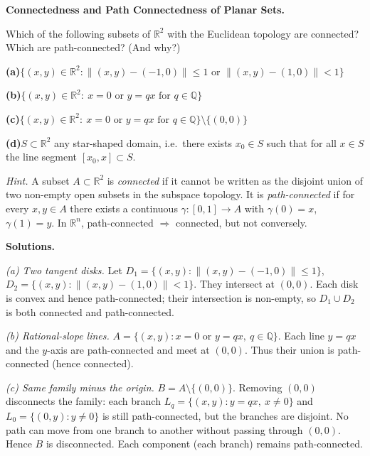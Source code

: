 \begin{problem}[CP-II-0514]
\label{prob:cp-ii-0514}
\textbf{Connectedness and Path Connectedness of Planar Sets.}

\hspace*{1.5em}Which of the following subsets of $\mathbb{R}^2$ with the Euclidean topology are connected?
	Which are path-connected? (And why?)

		\par\smallskip\noindent\textbf{(a)}\quad $\{(x,y)\in\mathbb{R}^2:\|(x,y)-(-1,0)\|\le1
		\text{ or }\|(x,y)-(1,0)\|<1\}$

		\par\smallskip\noindent\textbf{(b)}\quad $\{(x,y)\in\mathbb{R}^2:\ x=0
		\text{ or }y=qx\text{ for }q\in\mathbb{Q}\}$

		\par\smallskip\noindent\textbf{(c)}\quad $\{(x,y)\in\mathbb{R}^2:\ x=0
		\text{ or }y=qx\text{ for }q\in\mathbb{Q}\}\setminus\{(0,0)\}$

		\par\smallskip\noindent\textbf{(d)}\quad $S\subset\mathbb{R}^2$ any star-shaped domain,
		i.e.\ there exists $x_0\in S$ such that for all $x\in S$
		the line segment $[x_0,x]\subset S$.


	\emph{Hint.} A subset $A\subset\mathbb{R}^2$ is \emph{connected} if it cannot be written
	as the disjoint union of two non-empty open subsets in the subspace topology.
	It is \emph{path-connected} if for every $x,y\in A$ there exists a continuous
	$\gamma:[0,1]\to A$ with $\gamma(0)=x$, $\gamma(1)=y$.
	In $\mathbb{R}^n$, path-connected $\Rightarrow$ connected, but not conversely.


	\textbf{Solutions.}

	\textit{(a) Two tangent disks.}
	Let $D_1=\{(x,y):\|(x,y)-(-1,0)\|\le1\}$,
	$D_2=\{(x,y):\|(x,y)-(1,0)\|<1\}$.
	They intersect at $(0,0)$.
	Each disk is convex and hence path-connected;
	their intersection is non-empty,
	so $D_1\cup D_2$ is both connected and path-connected.

	\medskip

	\textit{(b) Rational-slope lines.}
	$A=\{(x,y):x=0\text{ or }y=qx,\ q\in\mathbb{Q}\}$.
	Each line $y=qx$ and the $y$-axis are path-connected and meet at $(0,0)$.
	Thus their union is path-connected (hence connected).

	\medskip

	\textit{(c) Same family minus the origin.}
	$B=A\setminus\{(0,0)\}$.
	Removing $(0,0)$ disconnects the family:
	each branch $L_q=\{(x,y):y=qx,\ x\neq0\}$ and $L_0=\{(0,y):y\neq0\}$
	is still path-connected, but the branches are disjoint.
	No path can move from one branch to another without passing through $(0,0)$.
	Hence $B$ is disconnected.
	Each component (each branch) remains path-connected.


\end{problem}
